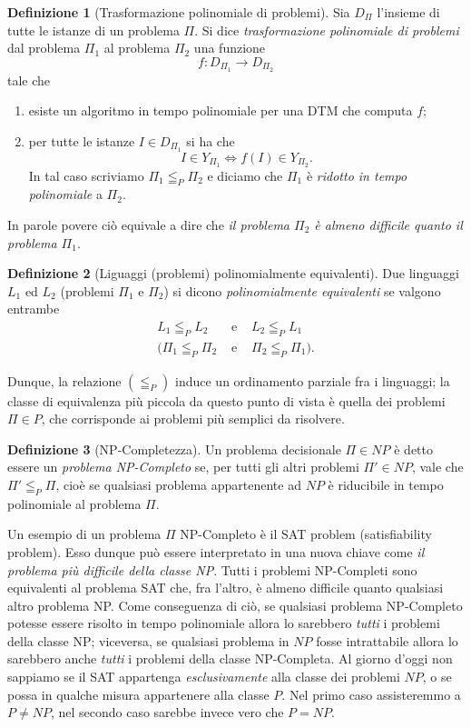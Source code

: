 \documentclass[10pt]{\classname}
\theoremstyle{newlinethm}
\theoremstyle{theorem}
\theoremstyle{definition}
\newtheorem{definizione}{Definizione}[section]
\theoremstyle{definition}
\theoremstyle{definition}
\theoremstyle{definition}
\begin{document}
\begin{definizione}[Trasformazione polinomiale di problemi]
    Sia $D_\Pi$ l'insieme di tutte le istanze di un problema $\Pi$. Si dice \emph{trasformazione polinomiale di problemi} dal problema $\Pi_1$ al problema $\Pi_2$ una funzione \[f : D_{\Pi_1} \rightarrow D_{\Pi_2}\] tale che
\begin{enumerate}
    \item esiste un algoritmo in tempo polinomiale per una DTM che computa $f$;
    \item per tutte le istanze $I \in D_{\Pi_1}$ si ha che \[I \in Y_{\Pi_1} \Leftrightarrow f(I) \in Y_{\Pi_2}.\] In tal caso scriviamo $\Pi_1 \leqq_P \Pi_2$ e diciamo che $\Pi_1$ è \emph{ridotto in tempo polinomiale} a $\Pi_2$.
\end{enumerate}

\end{definizione}

In parole povere ciò equivale a dire che \emph{il problema $\Pi_2$ è almeno difficile quanto il problema $\Pi_1$}.
\begin{definizione}[Liguaggi (problemi) polinomialmente equivalenti]
    Due linguaggi $L_1$ ed $L_2$ (problemi $\Pi_1$ e $\Pi_2$) si dicono \emph{polinomialmente equivalenti} se valgono entrambe
    \[
    \begin{array}{ccc}
        L_1 \leqq_P L_2 & \mbox{ e } & L_2 \leqq_P L_1 \\
        (\Pi_1 \leqq_P \Pi_2 & \mbox{ e } & \Pi_2 \leqq_P \Pi_1).
    \end{array}
\]
\end{definizione}
Dunque, la relazione $(\leqq_P)$ induce un ordinamento parziale fra i linguaggi; la classe di equivalenza più piccola da questo punto di vista è quella dei problemi $\Pi \in P$, che corrisponde ai problemi più semplici da risolvere.

\begin{definizione}[NP-Completezza]
    Un problema decisionale $\Pi \in NP$ è detto essere un \emph{problema NP-Completo} se, per tutti gli altri problemi $\Pi' \in NP$, vale che $\Pi' \leqq_P \Pi$, cioè se qualsiasi problema appartenente ad $NP$ è riducibile in tempo polinomiale al problema $\Pi$.
\end{definizione}
Un esempio di un problema $\Pi$ NP-Completo è il SAT problem (satisfiability problem). Esso dunque può essere interpretato in una nuova chiave come \emph{il problema più difficile della classe NP}. Tutti i problemi NP-Completi sono equivalenti al problema SAT che, fra l'altro, è almeno difficile quanto qualsiasi altro problema NP. Come conseguenza di ciò, se qualsiasi problema NP-Completo potesse essere risolto in tempo polinomiale allora lo sarebbero \emph{tutti} i problemi della classe NP; viceversa, se qualsiasi problema in $NP$ fosse intrattabile allora lo sarebbero anche \emph{tutti} i problemi della classe NP-Completa. Al giorno d'oggi non sappiamo se il SAT appartenga \emph{esclusivamente} alla classe dei problemi $NP$, o se possa in qualche misura appartenere alla classe $P$. Nel primo caso assisteremmo a $P \neq NP$, nel secondo caso sarebbe invece vero che $P = NP$.
\end{document}
